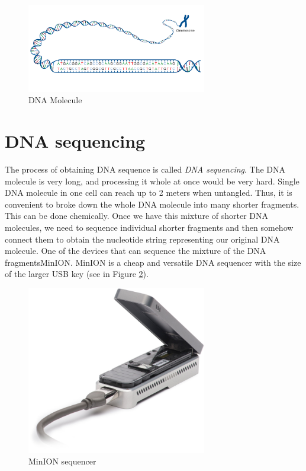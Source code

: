 \begin{figure}
\centerline{\includegraphics[width=0.7\textwidth, height=0.3\textheight]{images/acgt}}
\caption[DNA]{DNA Molecule}
\label{obr:acgt}
\end{figure}

\section{DNA sequencing}

The process of obtaining DNA sequence is called \textit{DNA sequencing}.
The DNA molecule is very long, and processing it whole at once would be very hard.
Single DNA molecule in one cell can reach up to 2 meters when untangled.
Thus, it is convenient to broke down the whole DNA molecule into many shorter fragments.
This can be done chemically. Once we have this mixture of shorter DNA molecules, we need to sequence individual
shorter fragments and then somehow connect them to obtain the nucleotide string representing
our original DNA molecule. One of the devices that can sequence the mixture of the
DNA fragmentsMinION\cite{lu2016oxford}. MinION is a cheap and versatile DNA sequencer
with the size of the larger USB key (see in Figure \ref{obr:minIon}).

\begin{figure}
\centerline{\includegraphics[width=0.7\textwidth, height=0.3\textheight]{images/minion}}
\caption[MinION]{MinION sequencer}
\label{obr:minIon}
\end{figure}


